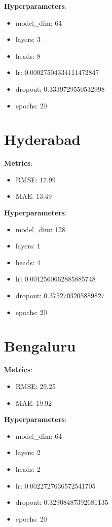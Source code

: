 \documentclass[12pt,a4paper]{book}
\begin{document}
\textbf{Hyperparameters}:
\begin{itemize}
    \item model\_dim: 64
    \item layers: 3
    \item heads: 8
    \item lr: 0.00027504334111472847
    \item dropout: 0.3339729550532998
    \item epochs: 20
\end{itemize}

\section{Hyderabad}
\textbf{Metrics}:
\begin{itemize}
    \item RMSE: 17.99
    \item MAE: 13.49
\end{itemize}

\textbf{Hyperparameters}:
\begin{itemize}
    \item model\_dim: 128
    \item layers: 1
    \item heads: 4
    \item lr: 0.0012560662885885748
    \item dropout: 0.3752703205889827
    \item epochs: 20
\end{itemize}

\section{Bengaluru}
\textbf{Metrics}:
\begin{itemize}
    \item RMSE: 29.25
    \item MAE: 19.92
\end{itemize}

\textbf{Hyperparameters}:
\begin{itemize}
    \item model\_dim: 64
    \item layers: 2
    \item heads: 2
    \item lr: 0.0022727636572541705
    \item dropout: 0.32908487392681135
    \item epochs: 20
\end{itemize}
\end{document}
